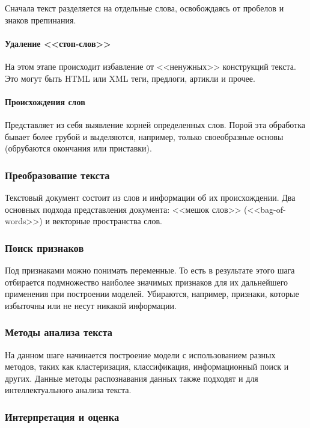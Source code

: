 \documentclass[14pt]{matmex-diploma-custom}
\begin{document}
Сначала текст разделяется на отдельные слова, освобождаясь от пробелов и знаков препинания.

\paragraph{Удаление <<стоп-слов>>}

На этом этапе происходит избавление от <<ненужных>> конструкций текста. Это могут быть HTML или XML теги, предлоги, артикли и прочее.

\paragraph{Происхождения слов} 

Представляет из себя выявление корней определенных слов. Порой эта обработка бывает более грубой и выделяются, например, только своеобразные основы (обрубаются окончания или приставки).

\subsubsection{Преобразование текста}

Текстовый документ состоит из слов и информации об их происхождении. Два основных подхода представления документа: <<мешок слов>> (<<bag-of-words>>) и векторные пространства слов.

\subsubsection{Поиск признаков}

Под признаками можно понимать переменные. То есть в результате этого шага отбирается подмножество наиболее значимых признаков для их дальнейшего применения при построении моделей. Убираются, например, признаки, которые избыточны или не несут никакой информации.

\subsubsection{Методы анализа текста}

На данном шаге начинается построение модели с использованием разных методов, таких как кластеризация, классификация, информационный поиск и других. Данные методы распознавания данных также подходят и для интеллектуального анализа текста.

\subsubsection{Интерпретация и оценка}
\end{document}
